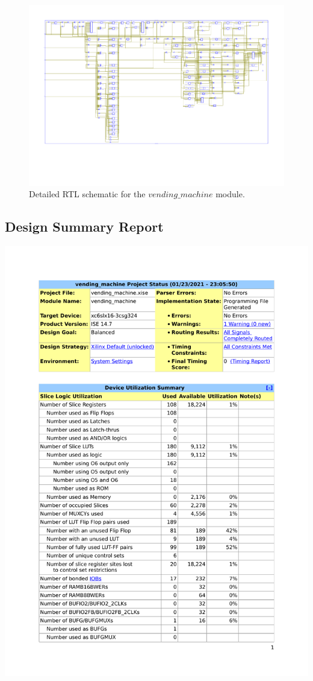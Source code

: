 \documentclass{article}
\begin{document}
\begin{figure}[H]
    \centering
    \includegraphics[scale=0.6]{../figs/schematic_detailed.pdf}
    \caption{Detailed RTL schematic for the $vending\_machine$ module.}
    \label{fig:schem_detailed}
\end{figure}

\subsection{Design Summary Report}

{\centering\includegraphics[scale=0.8, page=1]{../figs/design_summary.pdf}\par}
\end{document}
